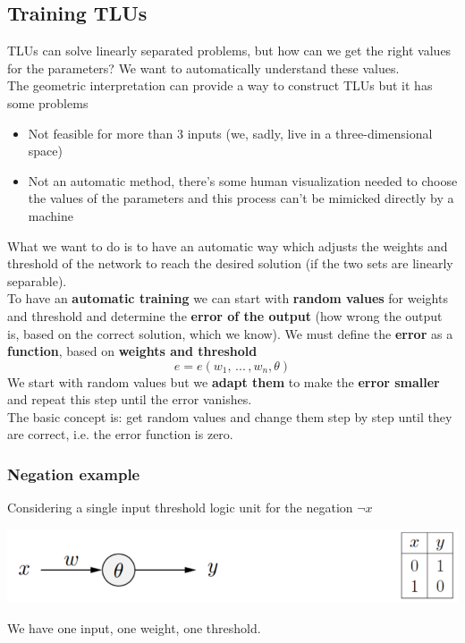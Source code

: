 
\newpage

\subsection{Training TLUs}
TLUs can solve linearly separated problems, but how can we get the right values for the parameters? We want to automatically understand these values.\\
The geometric interpretation can provide a way to construct TLUs but it has some problems
\begin{itemize}
	\item Not feasible for more than 3 inputs (we, sadly, live in a three-dimensional space)
	\item Not an automatic method, there's some human visualization needed to choose the values of the parameters and this process can't be mimicked directly by a machine
\end{itemize}

What we want to do is to have an automatic way which adjusts the weights and threshold of the network to reach the desired solution (if the two sets are linearly separable).\\

To have an \textbf{automatic training} we can start with \textbf{random values} for weights and threshold and determine the \textbf{error of the output} (how wrong the output is, based on the correct solution, which we know). We must define the \textbf{error} as a \textbf{function}, based on \textbf{weights and threshold} 
$$ e = e (w_1, \, ... \, , w_n , \theta) $$
We start with random values but we \textbf{adapt them} to make the \textbf{error smaller} and repeat this step until the error vanishes.\\

The basic concept is: get random values and change them step by step until they are correct, i.e. the error function is zero.\\

\newpage

\subsubsection{Negation example}
Considering a single input threshold logic unit for the negation $\neg x$
\begin{center}
	\includegraphics[width=0.85\columnwidth]{img/NN/TLU10}
\end{center}
We have one input, one weight, one threshold.\\

